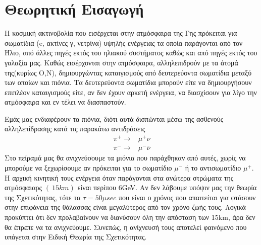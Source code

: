 \documentclass[a4paper]{book}
\begin{document}
	
\section*{Θεωρητική Εισαγωγή}
	Η κοσμική ακτινοβολία που εισέρχεται στην ατμόσφαιρα της Γης πρόκειται για σωματίδια (e, ακτίνες γ, νετρίνα) υψηλής ενέργειας τα οποία παράγονται από τον Ήλιο, από άλλες πηγές εκτός του ηλιακού συστήματος καθώς και από πηγές εκτός του γαλαξία μας. Καθώς εισέρχονται στην ατμόσφαιρα, αλληλεπιδρούν με τα άτομά της(κυρίως Ο,Ν), δημιουργώντας καταιγισμούς από δευτερεύοντα σωματίδια μεταξύ των οποίων και πιόνια. 
	Τα δευτερεύοντα σωματίδια μπορούν είτε να δημιουργήσουν επιπλέον καταιγισμούς είτε, αν δεν έχουν αρκετή ενέργεια, να διασχίσουν για λίγο την ατμόσφαιρα και εν τέλει να διασπαστούν. 
	
	Εμάς μας ενδιαφέρουν τα πιόνια, διότι αυτά δισπώνται μέσω της ασθενούς αλληλεπίδρασης κατά τις παρακάτω αντιδράσεις
		\begin{align}\label{eq1,2}
			\pi^+\rightarrow& \mu^+\nu\\
			\pi^-\rightarrow& \mu^-\bar{\nu}
		\end{align}
	Στο πείραμά μας θα ανιχνεύσουμε τα μιόνια που παράχθηκαν από αυτές, χωρίς να μπορούμε να ξεχωρίσουμε αν πρόκειται για το σωματίδιο $\mu^-$ ή το αντισωματίδιο $\mu^+$.
	 Η αρχική κινητική τους ενέργεια όταν παράγονται στα ανώτερα στρώματα της ατμόσφαιαρς $(~15km)$ είναι περίπου 6GeV.
	 Αν δεν λάβουμε υπόψιν μας την θεωρία της Σχετικότητας, τότε τα $\tau=50\mu sec$ που είναι ο χρόνος που απαιτείται για φτάσουν στην επιφάνεια της θάλασσας είναι μεγαλύτερος από τον χρόνο ζωής τους. Λογικά προκύπτει ότι δεν προλαβαίνουν να διανύσουν όλη την απόσταση των 15km, άρα δεν θα έπρεπε να τα ανιχνεύουμε. 
	 Συνεπώς, η ανίχνευσή τους αποτελεί φαινόμενο που υπάγεται στην Ειδική Θεωρία της Σχετικότητας.
	
\end{document}
